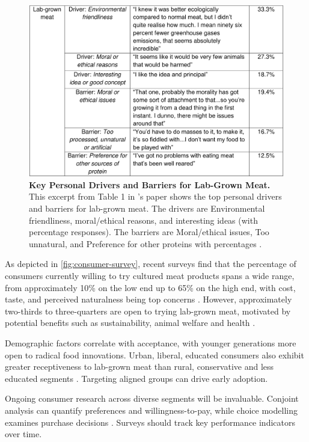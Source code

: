 \documentclass[10pt]{article}
\begin{document}
\begin{sloppypar}
  \begin{figure}[ht]
    \centering
    \includegraphics[width=\textwidth]{figures/excerpt-lab-grown-meat.png}
    \caption[Key Personal Drivers and Barriers for Lab-Grown Meat.]{\textbf{Key Personal Drivers and Barriers for Lab-Grown Meat.} This excerpt from Table 1 in \citeauthor{circus_exploring_2018}’s paper shows the top personal drivers and barriers for lab-grown meat. The drivers are Environmental friendliness, moral/ethical reasons, and interesting ideas (with percentage responses). The barriers are Moral/ethical issues, Too unnatural, and Preference for other proteins with percentages \citep{circus_exploring_2018}.}
    \label{fig:consumer-survey}
  \end{figure}

  As depicted in \autoref{fig:consumer-survey}, recent surveys find that the percentage of consumers currently willing to try cultured meat products spans a wide range, from approximately 10\% on the low end up to 65\% on the high end, with cost, taste, and perceived naturalness being top concerns \citep{bryant_consumer_2018}. However, approximately two-thirds to three-quarters are open to trying lab-grown meat, motivated by potential benefits such as sustainability, animal welfare and health \citep{wilks_attitudes_2017}.

  Demographic factors correlate with acceptance, with younger generations more open to radical food innovations. Urban, liberal, educated consumers also exhibit greater receptiveness to lab-grown meat than rural, conservative and less educated segments \citep{circus_exploring_2018}. Targeting aligned groups can drive early adoption.

  Ongoing consumer research across diverse segments will be invaluable. Conjoint analysis can quantify preferences and willingness-to-pay, while choice modelling examines purchase decisions \citep{wilks_attitudes_2017}. Surveys should track key performance indicators over time.


\end{sloppypar}
\end{document}
